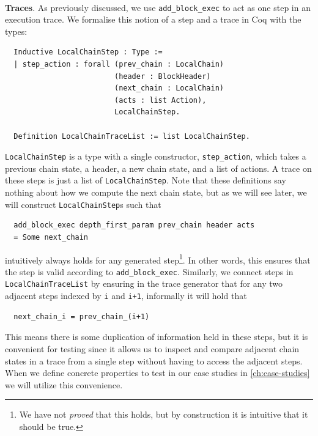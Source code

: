 \documentclass[twoside,11pt,openright]{report}
\newenvironment{code}{\captionsetup{type=figure, singlelinecheck=off, justification=raggedleft}}{}
\newcommand{\coq}[1]{\texttt{#1}}
\begin{document}
\medskip\\
\textbf{Traces}. As previously discussed, we use \coq{add\_block\_exec} to act as one step in an execution trace. We formalise this notion of a step and a trace in Coq with the types:
\begin{code}
\label{def:LocalChainStep}
\begin{verbatim}
  Inductive LocalChainStep : Type :=
  | step_action : forall (prev_chain : LocalChain) 
                         (header : BlockHeader) 
                         (next_chain : LocalChain) 
                         (acts : list Action), 
                         LocalChainStep.
                         
  Definition LocalChainTraceList := list LocalChainStep.
\end{verbatim}
\end{code}
\coq{LocalChainStep} is a type with a single constructor, \coq{step\_action}, which takes a previous chain state, a header, a new chain state, and a list of actions. A trace on these steps is just a list of \coq{LocalChainStep}. Note that these definitions say nothing about how we compute the next chain state, but as we will see later, we will construct \coq{LocalChainStep}s such that
\begin{code}
\begin{verbatim}
  add_block_exec depth_first_param prev_chain header acts 
  = Some next_chain
\end{verbatim}
\end{code}
intuitively always holds for any generated step\footnote{We have not \textit{proved} that this holds, but by construction it is intuitive that it should be true.}. In other words, this ensures that the step is valid according to \coq{add\_block\_exec}. Similarly, we connect steps in \coq{LocalChainTraceList} by ensuring in the trace generator that for any two adjacent steps indexed by \coq{i} and \coq{i+1}, informally it will hold that 
\begin{code}\begin{verbatim}
  next_chain_i = prev_chain_(i+1)
\end{verbatim}
\end{code}
This means there is some duplication of information held in these steps, but it is convenient for testing since it allows us to inspect and compare adjacent chain states in a trace from a single step without having to access the adjacent steps. When we define concrete properties to test in our case studies in \autoref{ch:case-studies} we will utilize this convenience.
\end{document}
